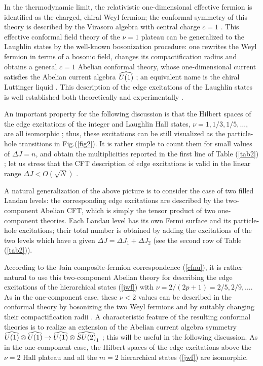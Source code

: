 In the thermodynamic limit, the relativistic one-dimensional effective
fermion is identified as the charged, chiral Weyl fermion; 
the conformal symmetry of this theory is
described by the Virasoro algebra with central charge $c=1$ \cite{gins}.
This effective conformal field theory of the $\nu=1$ plateau can be 
generalized to the Laughlin 
states by the well-known bosonization procedure:
one rewrites the Weyl fermion in terms of a bosonic field, changes its 
compactification radius and obtains a general $c=1$ 
Abelian conformal theory, whose one-dimensional current
satisfies the Abelian current algebra $\u1$ \cite{cdtz1}; 
an equivalent name is the chiral Luttinger liquid \cite{wen}.
This description of the edge excitations of the Laughlin states
is well established both theoretically and 
experimentally \cite{tdom}\cite{mill}\cite{shot}. 

An important property for the following discussion is that the Hilbert 
spaces of the edge excitations of the integer and Laughlin Hall states,
$\nu=1,1/3,1/5,\dots$, are all isomorphic \cite{wen}; thus, these excitations 
can be still visualized as the particle-hole transitions 
in Fig.(\ref{fig2}).
It is rather simple to count them for small values of $\Delta J=n$, and 
obtain the multiplicities reported in the first line of Table (\ref{tab2})
\cite{wen}; let us stress that the CFT description of edge excitations 
is valid in the linear range $\Delta J < O(\sqrt{N})$ 
\cite{cdtz1}.

A natural generalization of the above picture is to consider the
case of two filled Landau levels: the corresponding edge excitations
are described by the two-component Abelian CFT, which is simply the
tensor product of two one-component theories.
Each Landau level has its own Fermi surface and its particle-hole 
excitations;
their total number is obtained by adding the excitations of the two
levels which have a given $\Delta J=\Delta J_1 +\Delta J_2$
(see the second row of Table (\ref{tab2})).

According to the Jain composite-fermion correspondence (\ref{cfnu}), it is
rather natural to use this two-component Abelian theory for
describing the edge excitations of the hierarchical states (\ref{jwf})
with $\nu=2/(2p+1)=2/5,2/9,\dots$.
As in the one-component case, these $\nu<2$ values can be described
in the conformal theory by bosonizing the two Weyl fermions and by suitably 
changing their compactification radii \cite{wen}.
A characteristic feature of the resulting conformal theories is to realize
an extension of the Abelian current algebra symmetry
$\u1\otimes\u1 \to \u1\otimes\su2$ \cite{read}\cite{juerg}; 
this will be useful in the following discussion.
As in the one-component case, the Hilbert spaces of the edge excitations
above the $\nu=2$ Hall plateau and all the $m=2$ hierarchical states 
(\ref{jwf}) are isomorphic.


